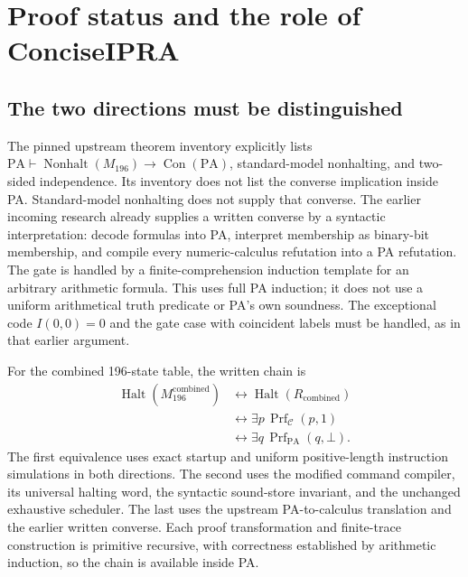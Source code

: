 \section{Proof status and the role of ConciseIPRA}
\label{sec:proof-status-conciseipra}

\subsection{The two directions must be distinguished}

The pinned upstream theorem inventory explicitly lists
$\mathrm{PA}\vdash\operatorname{Nonhalt}(M_{196})\to
\operatorname{Con}(\mathrm{PA})$, standard-model nonhalting, and two-sided
independence.  Its inventory does not list the converse implication inside
PA.  Standard-model nonhalting does not supply that converse.  The earlier
incoming research already supplies a written converse by a syntactic
interpretation: decode formulas into PA, interpret membership as binary-bit
membership, and compile every numeric-calculus refutation into a PA
refutation.  The gate is handled by a finite-comprehension induction
template for an arbitrary arithmetic formula.  This uses full PA induction;
it does not use a uniform arithmetical truth predicate or PA's own soundness.
The exceptional code $I(0,0)=0$ and the gate case with coincident labels must
be handled, as in that earlier argument.

For the combined 196-state table, the written chain is
\[
\begin{split}
 \operatorname{Halt}(M_{196}^{\mathrm{combined}})
 &\longleftrightarrow\operatorname{Halt}(R_{\mathrm{combined}})\\
 &\longleftrightarrow\exists p\,\operatorname{Prf}_{\mathcal C}(p,1)\\
 &\longleftrightarrow\exists q\,\operatorname{Prf}_{\mathrm{PA}}(q,\bot).
\end{split}
\]
The first equivalence uses exact startup and uniform positive-length
instruction simulations in both directions.  The second uses the modified
command compiler, its universal halting word, the syntactic sound-store
invariant, and the unchanged exhaustive scheduler.  The last uses the
upstream PA-to-calculus translation and the earlier written converse.
Each proof transformation and finite-trace construction is primitive
recursive, with correctness established by arithmetic induction, so the
chain is available inside PA.

